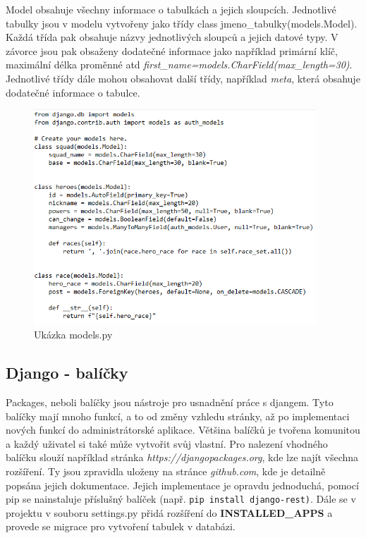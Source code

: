 Model obsahuje všechny informace o tabulkách a jejich
sloupcích. Jednotlivé tabulky jsou v modelu vytvořeny jako třídy class
jmeno\_tabulky(models.Model). Každá třída pak obsahuje názvy
jednotlivých sloupců a jejich datové typy. V závorce jsou pak obsaženy
dodatečné informace jako například primární klíč, maximální délka
proměnné atd
\textit{first\_name=models.CharField(max\_length=30)}. Jednotlivé
třídy dále mohou obsahovat další třídy, například \textit{meta}, která obsahuje
dodatečné informace o tabulce.

\vspace{15px}

\begin{figure}[H] \centering
    \includegraphics[width=300pt]{./pictures/2-model-example.png}
    \caption[Model příklad]{Ukázka models.py \cite{}}
	\label{fig:Ukázka models.py}                                
\end{figure}

\newpage

\subsection{Django - balíčky}

Packages, neboli balíčky jsou nástroje pro usnadnění práce s
djangem. Tyto balíčky mají mnoho funkcí, a to od změny vzhledu
stránky, až po implementaci nových funkcí do administrátorské aplikace. Většina
balíčků je tvořena komunitou a každý uživatel si také může vytvořit
svůj vlastní. Pro nalezení vhodného balíčku slouží například stránka
\textit{https://djangopackages.org}, kde lze najít všechna
rozšíření. Ty jsou zpravidla uloženy na stránce \textit{github.com}, kde
je detailně popsána jejich dokumentace. Jejich implementace je opravdu
jednoduchá, pomocí pip se nainstaluje příslušný balíček (např. {\tt pip
install django-rest)}. Dále se v projektu v souboru settings.py přidá
rozšíření do \textbf{INSTALLED\_APPS} a provede se migrace pro
vytvoření tabulek v databázi.

